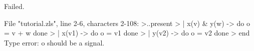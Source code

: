 \runverbatimfalse
{}
\begin{RunVerbatimMsg}
Failed.
\end{RunVerbatimMsg}
\begin{RunVerbatimErr}
File "tutorial.zls", line 2-6, characters 2-108:
>..present
>  | x(v) & y(w) -> do o = v + w done
>  | x(v1) -> do o = v1 done
>  | y(v2) -> do o = v2 done
>  end
Type error: o should be a signal.
\end{RunVerbatimErr}
